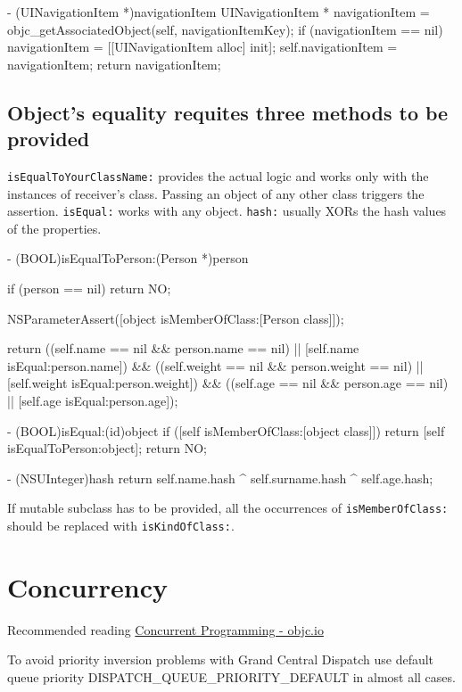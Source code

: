 \documentclass[10pt]{extarticle}
\newenvironment{importantlisting}
{\mdframed[middlelinewidth=0.5pt, middlelinecolor=MatisseColor, skipabove=15pt]{\textbf{Important:}}}
{\endmdframed\vspace{12pt}}
\newcommand{\inlinecode}[1]{{\textcolor{TundoraColor}{\texttt{#1}}}}
\begin{document}
\begin{codelisting}
- (UINavigationItem *)navigationItem
{
    UINavigationItem * navigationItem = objc_getAssociatedObject(self, navigationItemKey);
    if (navigationItem == nil) {
        navigationItem = [[UINavigationItem alloc] init];
        self.navigationItem = navigationItem;
    }
    return navigationItem;
}
\end{codelisting}


\subsection{Object's equality requites three methods to be provided}

\inlinecode{isEqualToYourClassName:} provides the actual logic and works only with the instances of receiver's class. Passing an object of any other class triggers the assertion. \inlinecode{isEqual:} works with any object. \inlinecode{hash:} usually XORs the hash values of the properties.

\begin{codelisting}
- (BOOL)isEqualToPerson:(Person *)person
{
    if (person == nil) return NO;
    
    NSParameterAssert([object isMemberOfClass:[Person class]]);
    
    return ((self.name   == nil && person.name   == nil) || [self.name   isEqual:person.name])   &&
           ((self.weight == nil && person.weight == nil) || [self.weight isEqual:person.weight]) &&
           ((self.age    == nil && person.age    == nil) || [self.age    isEqual:person.age]);
}

- (BOOL)isEqual:(id)object
{
    if ([self isMemberOfClass:[object class]]) return [self isEqualToPerson:object];
    return NO;
}

- (NSUInteger)hash
{
    return self.name.hash ^ self.surname.hash ^ self.age.hash;
}
\end{codelisting}

If mutable subclass has to be provided, all the occurrences of \inlinecode{isMemberOfClass:} should be replaced with \inlinecode{isKindOfClass:}.


\section{Concurrency}

Recommended reading  \href{http://www.objc.io/issue-2/}{Concurrent Programming - objc.io}

\begin{importantlisting}
To avoid priority inversion problems with Grand Central Dispatch use default queue priority DISPATCH\_QUEUE\_PRIORITY\_DEFAULT in almost all cases.
\end{importantlisting}
\end{document}
